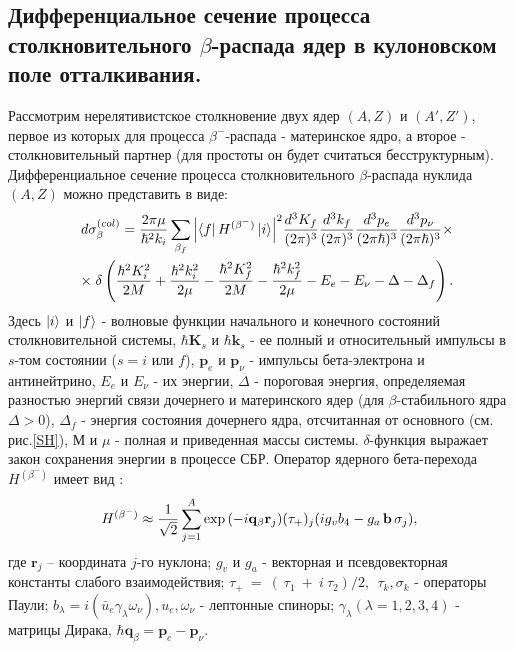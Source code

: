 \documentclass[%
master,    %
natbib,      %
subf,        %
href,        %
colorlinks,  %
]{disser}
\let\vec=\mathbf
\begin{document}
\subsection{Дифференциальное сечение  процесса столкновительного
	$\beta$-распада ядер в кулоновском поле отталкивания.}

Рассмотрим нерелятивистское столкновение двух ядер $(A,Z)$ и $(A',Z')$,
первое из которых для процесса $\beta^-$-распада - материнское ядро, а второе
- столкновительный партнер (для простоты он будет считаться
бесструктурным).
Дифференциальное сечение процесса столкновительного $\beta$-распада
нуклида $(A,Z)$ можно  представить в виде:
\begin{eqnarray}\label{ds}
&&d\sigma^{(col)}_\beta={2\pi\mu\over{\hbar^2k_i}}\sum_{\beta_f}{\left| \bra{f} H^{(\beta^-)}
	\ket{i}\right|}^2{d^3 K_f\over{(2\pi)^3}}{d^3 k_f\over{(2\pi)^3}}
{d^3 p_e\over{(2\pi\hbar)^3}}{d^3 p_\nu\over{(2\pi\hbar)^3}}\times\nonumber\\
&&\times\;\delta\left({\hbar^2 K_i^2\over{2 M}}+{\hbar^2 k_i^2\over{2\mu}}-{\hbar^2 K_f^2\over{2 M}}-
{\hbar^2 k_f^2\over{2\mu}}-E_e-E_\nu-\Delta-\Delta_f\right).
\end{eqnarray}
Здесь $\ket{i}$ и $\ket{f}$ - волновые функции начального и конечного состояний
столкновительной системы,
$\hbar \vec K_s$ и $\hbar \vec k_s$ - ее полный и относительный импульсы
в $s$-том состоянии ($s=i$ или $f$),
$\vec p_e$ и $\vec p_\nu$ - импульсы бета-электрона и антинейтрино,
$E_e$ и $E_\nu$ - их энергии,
$\Delta$ - пороговая энергия, определяемая разностью энергий связи
дочернего и материнского ядер (для $\beta$-стабильного ядра $\Delta>0$),
$\Delta_f$  - энергия состояния дочернего ядра, отсчитанная от
основного (см. рис.\ref{SH}),
$М$ и $\mu$ - полная и приведенная массы системы.
$\delta$-функция выражает закон сохранения энергии в процессе СБР.
Оператор ядерного бета-перехода  $H^{(\beta^-)}$ имеет вид \cite{aiz}:
\begin{eqnarray}\label{nH^beta}
H^{(\beta^-)}\approx {{1}\over{\sqrt{2}}}\sum_{j=1}^{A} \exp{( -i \vec q_\beta \vec r_j)}
(\tau_+)_j ( i g_v b_4 - g_a\, \vec b\, \vec \sigma_j ),
\end{eqnarray}
где $\vec r_j$ -- координата $j$-го нуклона;
$g_v$ и $g_a$ - векторная и псевдовекторная константы слабого
взаимодействия;
$\tau_+~=~(~\tau_1~+~i~\tau_2)/2$, $\;\tau_k,\sigma_k$ - операторы Паули;
$b_\lambda=i ( \bar u_e \gamma_\lambda \omega_\nu), u_e, \omega_\nu$ - лептонные
спиноры; $\gamma_\lambda (\lambda = 1,2,3,4 )$ - матрицы Дирака,
$\hbar \vec q_\beta=\vec p_e-\vec p_\nu$.
\end{document}
